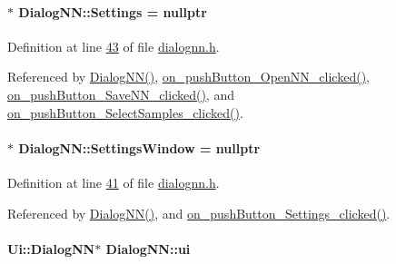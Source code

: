 \hypertarget{class_dialog_n_n_afdf8c81b845ec58a3f495c2dd3423377}{}
\paragraph[{Settings}]{$\ast$ Dialog\+N\+N\+::\+Settings = nullptr\hspace{0.3cm}{\ttfamily [private]}}\label{class_dialog_n_n_afdf8c81b845ec58a3f495c2dd3423377}


Definition at line \hyperlink{dialognn_8h_source_l00043}{43} of file \hyperlink{dialognn_8h_source}{dialognn.\+h}.



Referenced by \hyperlink{dialognn_8cpp_source_l00004}{Dialog\+N\+N()}, \hyperlink{dialognn_8cpp_source_l00130}{on\+\_\+push\+Button\+\_\+\+Open\+N\+N\+\_\+clicked()}, \hyperlink{dialognn_8cpp_source_l00118}{on\+\_\+push\+Button\+\_\+\+Save\+N\+N\+\_\+clicked()}, and \hyperlink{dialognn_8cpp_source_l00075}{on\+\_\+push\+Button\+\_\+\+Select\+Samples\+\_\+clicked()}.

\hypertarget{class_dialog_n_n_aeaad085b1b2c7e4613228aa612d725f4}{}
\paragraph[{Settings\+Window}]{$\ast$ Dialog\+N\+N\+::\+Settings\+Window = nullptr\hspace{0.3cm}{\ttfamily [private]}}\label{class_dialog_n_n_aeaad085b1b2c7e4613228aa612d725f4}


Definition at line \hyperlink{dialognn_8h_source_l00041}{41} of file \hyperlink{dialognn_8h_source}{dialognn.\+h}.



Referenced by \hyperlink{dialognn_8cpp_source_l00004}{Dialog\+N\+N()}, and \hyperlink{dialognn_8cpp_source_l00044}{on\+\_\+push\+Button\+\_\+\+Settings\+\_\+clicked()}.

\hypertarget{class_dialog_n_n_affd6ce2909be5826c52fd862d1963eee}{}
\paragraph[{ui}]{\setlength{\rightskip}{0pt plus 5cm}Ui\+::\+Dialog\+N\+N$\ast$ Dialog\+N\+N\+::ui\hspace{0.3cm}{\ttfamily [private]}}\label{class_dialog_n_n_affd6ce2909be5826c52fd862d1963eee}


